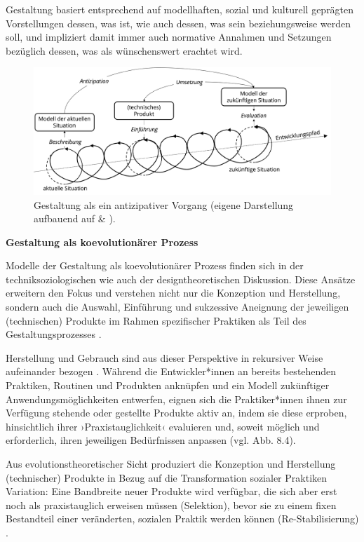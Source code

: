 \documentclass[
  a4paper,
]{book}
\begin{document}
Gestaltung basiert entsprechend auf modellhaften, sozial und kulturell geprägten Vorstellungen dessen, was ist, wie auch dessen, was sein beziehungsweise werden soll, und impliziert damit immer auch normative Annahmen und Setzungen bezüglich dessen, was als wünschenswert erachtet wird.

\begin{figure}
\centering
\includegraphics{Figures/08-03-Antizipation.png}
\caption{\label{fig:fig10}Gestaltung als ein antizipativer Vorgang (eigene Darstellung aufbauend auf \citet{krippendorffProductSemanticsTriangulation1989} \& \citet{zamenopoulosAnticipatoryViewDesign2007}).}
\end{figure}

\textbf{Gestaltung als koevolutionärer Prozess}

Modelle der Gestaltung als koevolutionärer Prozess finden sich in der techniksoziologischen wie auch der designtheoretischen Diskussion. Diese Ansätze erweitern den Fokus und verstehen nicht nur die Konzeption und Herstellung, sondern auch die Auswahl, Einführung und sukzessive Aneignung der jeweiligen (technischen) Produkte im Rahmen spezifischer Praktiken als Teil des Gestaltungsprozesses \citep[vgl.][]{carrollCompletingDesignUse2004}.

Herstellung und Gebrauch sind aus dieser Perspektive in rekursiver Weise aufeinander bezogen \citep[vgl.][]{bolinHeuristicsAlgorithmBig2015}. Während die Entwickler*innen an bereits bestehenden Praktiken, Routinen und Produkten anknüpfen und ein Modell zukünftiger Anwendungsmöglichkeiten entwerfen, eignen sich die Praktiker*innen ihnen zur Verfügung stehende oder gestellte Produkte aktiv an, indem sie diese erproben, hinsichtlich ihrer ›Praxistauglichkeit‹ evaluieren und, soweit möglich und erforderlich, ihren jeweiligen Bedürfnissen anpassen (vgl. {Abb. 8.4}).

Aus evolutionstheoretischer Sicht produziert die Konzeption und Herstellung (technischer) Produkte in Bezug auf die Transformation sozialer Praktiken Variation: Eine Bandbreite neuer Produkte wird verfügbar, die sich aber erst noch als praxistauglich erweisen müssen (Selektion), bevor sie zu einem fixen Bestandteil einer veränderten, sozialen Praktik werden können (Re-Stabilisierung) \citep[vgl.][]{jonasDesignResearchIts2007}.
\end{document}
